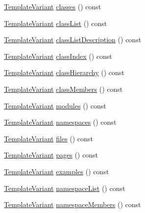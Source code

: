 \begin{DoxyCompactItemize}
\item 
\hyperlink{class_template_variant}{Template\+Variant} \hyperlink{class_translate_context_1_1_private_aded565988682e9284c74b3985aff320e}{classes} () const 
\item 
\hyperlink{class_template_variant}{Template\+Variant} \hyperlink{class_translate_context_1_1_private_ae66fcaf49440fc3a223b9aeb39a5eefd}{class\+List} () const 
\item 
\hyperlink{class_template_variant}{Template\+Variant} \hyperlink{class_translate_context_1_1_private_a0b9c7f542dad19cc56c4bc21758a6f54}{class\+List\+Description} () const 
\item 
\hyperlink{class_template_variant}{Template\+Variant} \hyperlink{class_translate_context_1_1_private_aef7cf93a579bfe6a095372200c3f90d4}{class\+Index} () const 
\item 
\hyperlink{class_template_variant}{Template\+Variant} \hyperlink{class_translate_context_1_1_private_aec325c5053faecad00d9ca7ba5c38638}{class\+Hierarchy} () const 
\item 
\hyperlink{class_template_variant}{Template\+Variant} \hyperlink{class_translate_context_1_1_private_a9898cf201dbe2625c6f20a0d4ff74d2b}{class\+Members} () const 
\item 
\hyperlink{class_template_variant}{Template\+Variant} \hyperlink{class_translate_context_1_1_private_a462db3e83532df1b919c9a94b7cb4bfb}{modules} () const 
\item 
\hyperlink{class_template_variant}{Template\+Variant} \hyperlink{class_translate_context_1_1_private_aac6a12a796290ae5ca917696147a2213}{namespaces} () const 
\item 
\hyperlink{class_template_variant}{Template\+Variant} \hyperlink{class_translate_context_1_1_private_ab601a76b22b24670d53103b062ca9b8a}{files} () const 
\item 
\hyperlink{class_template_variant}{Template\+Variant} \hyperlink{class_translate_context_1_1_private_a24112a1ba386d666eae0b82b9cbfdbcf}{pages} () const 
\item 
\hyperlink{class_template_variant}{Template\+Variant} \hyperlink{class_translate_context_1_1_private_acc9541b9ee6d07be1b7d985f18c7c084}{examples} () const 
\item 
\hyperlink{class_template_variant}{Template\+Variant} \hyperlink{class_translate_context_1_1_private_aa60848ed71b6cbe8ef8a8bf4b941cc56}{namespace\+List} () const 
\item 
\hyperlink{class_template_variant}{Template\+Variant} \hyperlink{class_translate_context_1_1_private_a6ac77bfe3b458cd34533fb316d23d753}{namespace\+Members} () const 

\end{DoxyCompactItemize}
